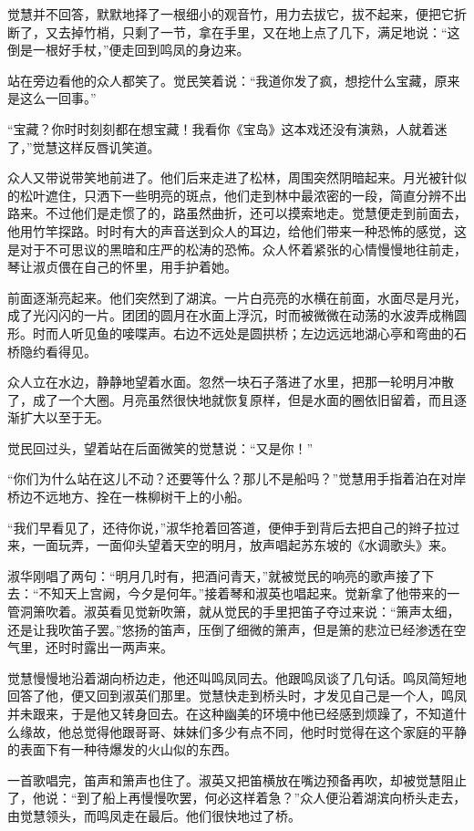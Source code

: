 \par 觉慧并不回答，默默地择了一根细小的观音竹，用力去拔它，拔不起来，便把它折断了，又去掉竹梢，只剩了一节，拿在手里，又在地上点了几下，满足地说：“这倒是一根好手杖，”便走回到鸣凤的身边来。
\par 站在旁边看他的众人都笑了。觉民笑着说：“我道你发了疯，想挖什么宝藏，原来是这么一回事。”
\par “宝藏？你时时刻刻都在想宝藏！我看你《宝岛》这本戏还没有演熟，人就着迷了，”觉慧这样反唇讥笑道。
\par 众人又带说带笑地前进了。他们后来走进了松林，周围突然阴暗起来。月光被针似的松叶遮住，只洒下一些明亮的斑点，他们走到林中最浓密的一段，简直分辨不出路来。不过他们是走惯了的，路虽然曲折，还可以摸索地走。觉慧便走到前面去，他用竹竿探路。时时有大的声音送到众人的耳边，给他们带来一种恐怖的感觉，这是对于不可思议的黑暗和庄严的松涛的恐怖。众人怀着紧张的心情慢慢地往前走，琴让淑贞偎在自己的怀里，用手护着她。
\par 前面逐渐亮起来。他们突然到了湖滨。一片白亮亮的水横在前面，水面尽是月光，成了光闪闪的一片。团团的圆月在水面上浮沉，时而被微微在动荡的水波弄成椭圆形。时而人听见鱼的唼喋声。右边不远处是圆拱桥；左边远远地湖心亭和弯曲的石桥隐约看得见。
\par 众人立在水边，静静地望着水面。忽然一块石子落进了水里，把那一轮明月冲散了，成了一个大圈。月亮虽然很快地就恢复原样，但是水面的圈依旧留着，而且逐渐扩大以至于无。
\par 觉民回过头，望着站在后面微笑的觉慧说：“又是你！”
\par “你们为什么站在这儿不动？还要等什么？那儿不是船吗？”觉慧用手指着泊在对岸桥边不远地方、拴在一株柳树干上的小船。
\par “我们早看见了，还待你说，”淑华抢着回答道，便伸手到背后去把自己的辫子拉过来，一面玩弄，一面仰头望着天空的明月，放声唱起苏东坡的《水调歌头》来。
\par 淑华刚唱了两句：“明月几时有，把酒问青天，”就被觉民的响亮的歌声接了下去：“不知天上宫阙，今夕是何年。”接着琴和淑英也唱起来。觉新拿了他带来的一管洞箫吹着。淑英看见觉新吹箫，就从觉民的手里把笛子夺过来说：“箫声太细，还是让我吹笛子罢。”悠扬的笛声，压倒了细微的箫声，但是箫的悲泣已经渗透在空气里，还时时露出一两声来。
\par 觉慧慢慢地沿着湖向桥边走，他还叫鸣凤同去。他跟鸣凤谈了几句话。鸣凤简短地回答了他，便又回到淑英们那里。觉慧快走到桥头时，才发见自己是一个人，鸣凤并未跟来，于是他又转身回去。在这种幽美的环境中他已经感到烦躁了，不知道什么缘故，他总觉得他跟哥哥、妹妹们多少有点不同，他时时觉得在这个家庭的平静的表面下有一种待爆发的火山似的东西。
\par 一首歌唱完，笛声和箫声也住了。淑英又把笛横放在嘴边预备再吹，却被觉慧阻止了，他说：“到了船上再慢慢吹罢，何必这样着急？”众人便沿着湖滨向桥头走去，由觉慧领头，而鸣凤走在最后。他们很快地过了桥。
